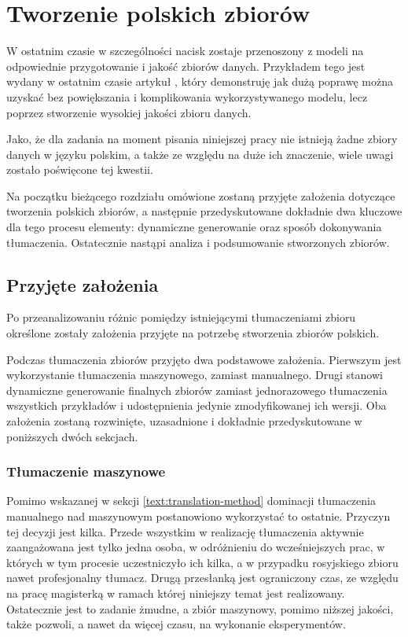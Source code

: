 \chapter{Tworzenie polskich zbiorów}
W ostatnim czasie w szczególności nacisk zostaje przenoszony z modeli na odpowiednie przygotowanie i jakość zbiorów danych. Przykładem tego jest wydany w ostatnim czasie artykuł  \cite{Gunasekar2023}, który demonstruję jak dużą poprawę można uzyskać bez powiększania i komplikowania wykorzystywanego modelu, lecz poprzez stworzenie wysokiej jakości zbioru danych.

Jako, że dla zadania  na moment pisania niniejszej pracy nie istnieją żadne zbiory danych w języku polskim, a także ze względu na duże ich znaczenie, wiele uwagi zostało poświęcone tej kwestii. 

Na początku bieżącego rozdziału omówione zostaną przyjęte założenia dotyczące tworzenia polskich zbiorów, a następnie przedyskutowane dokładnie dwa kluczowe dla tego procesu elementy: dynamiczne generowanie oraz sposób dokonywania tłumaczenia. Ostatecznie nastąpi analiza i podsumowanie stworzonych zbiorów.

\section{Przyjęte założenia}
Po przeanalizowaniu różnic pomiędzy istniejącymi tłumaczeniami zbioru  określone zostały założenia przyjęte na potrzebę stworzenia zbiorów polskich.

Podczas tłumaczenia zbiorów przyjęto dwa podstawowe założenia. Pierwszym jest wykorzystanie tłumaczenia maszynowego, zamiast manualnego. Drugi stanowi dynamiczne generowanie finalnych zbiorów zamiast jednorazowego tłumaczenia wszystkich przykładów i udostępnienia jedynie zmodyfikowanej ich wersji. Oba założenia zostaną rozwinięte, uzasadnione i dokładnie przedyskutowane w poniższych dwóch sekcjach.

\subsection{Tłumaczenie maszynowe}
Pomimo wskazanej w sekcji \ref{text:translation-method} dominacji tłumaczenia manualnego nad maszynowym postanowiono wykorzystać to ostatnie. Przyczyn tej decyzji jest kilka. Przede wszystkim w realizację tłumaczenia aktywnie zaangażowana jest tylko jedna osoba, w odróżnieniu do wcześniejszych prac, w których w tym procesie uczestniczyło ich kilka, a w przypadku rosyjskiego zbioru nawet profesjonalny tłumacz. Drugą przesłanką jest ograniczony czas, ze względu na pracę magisterką w ramach której niniejszy temat jest realizowany. Ostatecznie jest to zadanie żmudne, a zbiór maszynowy, pomimo niższej jakości, także pozwoli, a nawet da więcej czasu, na wykonanie eksperymentów.

